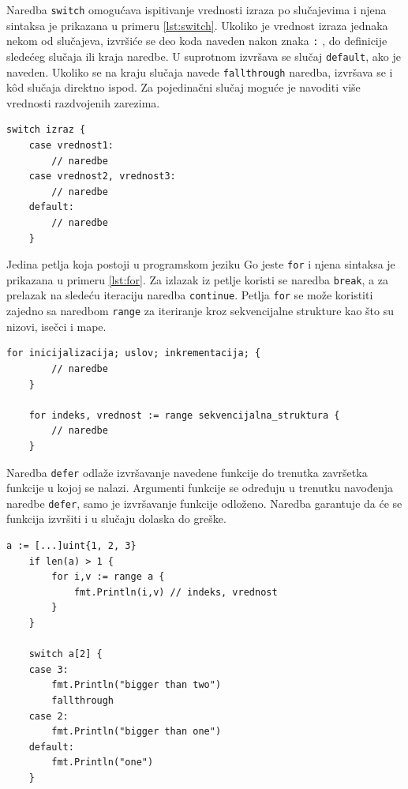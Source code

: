 \documentclass[12pt,oneside]{memoir}
\begin{document}
Naredba \texttt{switch} omogućava ispitivanje vrednosti izraza po slučajevima i njena sintaksa je prikazana u primeru \ref{lst:switch}. Ukoliko je vrednost izraza jednaka nekom od slučajeva, izvršiće se deo koda naveden nakon znaka \texttt{:} , do definicije sledećeg slučaja ili kraja naredbe. U suprotnom izvršava se slučaj \texttt{default}, ako je naveden. Ukoliko se na kraju slučaja navede \texttt{fallthrough} naredba, izvršava se i k\^{o}d slučaja direktno ispod. Za pojedinačni slučaj moguće je navoditi više vrednosti razdvojenih zarezima. 

\begin{center}
\begin{lstlisting}[caption=Sintaksa naredbe \texttt{switch}, label={lst:switch},  backgroundcolor=\color{background}]
	switch izraz {
    case vrednost1:
        // naredbe
    case vrednost2, vrednost3:
       	// naredbe
    default:
      	// naredbe
    }
\end{lstlisting}
\end{center}


Jedina petlja koja postoji u programskom jeziku Go jeste \texttt{for} i njena sintaksa je prikazana u primeru \ref{lst:for}. Za izlazak iz petlje koristi se naredba \texttt{break}, a za prelazak na sledeću iteraciju naredba \texttt{continue}. Petlja \texttt{for} se može koristiti zajedno sa naredbom \texttt{range} za iteriranje kroz sekvencijalne strukture kao što su nizovi, isečci i mape. 

\begin{center}
\begin{lstlisting}[caption=Sintaksa \texttt{for} petlje, label={lst:for},  backgroundcolor=\color{background}]
	for inicijalizacija; uslov; inkrementacija; { 
		// naredbe
	}

	for indeks, vrednost := range sekvencijalna_struktura {
		// naredbe
	}
\end{lstlisting}
\end{center}


Naredba \texttt{defer} odlaže izvršavanje navedene funkcije do trenutka završetka funkcije u kojoj se nalazi. Argumenti funkcije se određuju u trenutku navođenja naredbe \texttt{defer}, samo je izvršavanje funkcije odloženo. Naredba garantuje da će se funkcija izvršiti i u slučaju dolaska do greške. 

\begin{center}
\begin{lstlisting}[caption=Primer koji demonstrira upotrebu kontrolnih struktura, label={lst:control},  backgroundcolor=\color{background}]
	a := [...]uint{1, 2, 3}
	if len(a) > 1 {
		for i,v := range a {	
			fmt.Println(i,v) // indeks, vrednost
		}
	}

	switch a[2] {
    case 3:
        fmt.Println("bigger than two")
		fallthrough
    case 2:
        fmt.Println("bigger than one")
    default:
        fmt.Println("one")
    }
\end{lstlisting}
\end{center}
\end{document}
